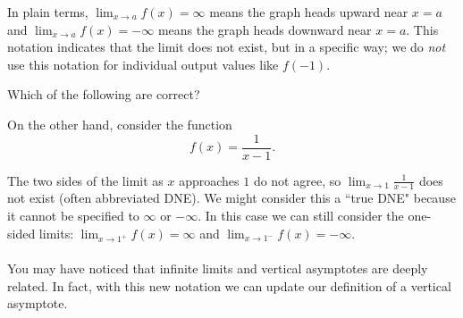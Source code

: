 \documentclass{ximera}
\begin{document}
In plain terms, $\lim_{x\to a} f(x) = \infty$ means the graph heads upward near $x=a$ and $\lim_{x\to a} f(x) = -\infty$ means the graph heads downward near $x=a$. This notation indicates that the limit does not exist, but in a specific way; we do \emph{not} use this notation for individual output values like $f(-1)$.


\begin{question}
  Which of the following are correct?
  \begin{selectAll}
  \end{selectAll}
\end{question}

On the other hand, consider the function 
\[
f(x) = \frac{1}{x-1}.
\]
\begin{image}
\end{image}
The two sides of the limit as $x$ approaches $1$ do not agree, so $\displaystyle\lim_{x\rightarrow 1}\frac{1}{x-1}$ does not exist (often abbreviated DNE). We might consider this a ``true DNE" because it cannot be specified to $\infty$ or $-\infty$. In this case we can still consider the one-sided
limits: $\lim_{x\to 1^+} f(x) = \infty$ and $\lim_{x\to 1^-} f(x) =
-\infty$.
\\
\\You may have noticed that infinite limits and vertical asymptotes are deeply related. In fact, with this new notation we can update our definition of a vertical asymptote.
\end{document}
